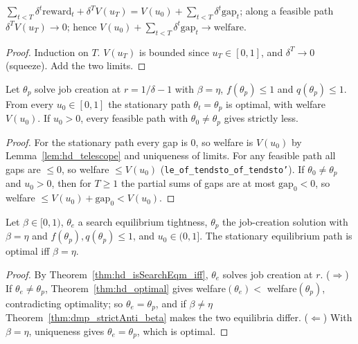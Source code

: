 \begin{lemma}
\label{lem:hd_telescope}
\leanok
{}
$\sum_{t<T}\delta^t \mathrm{reward}_t + \delta^T V(u_T) = V(u_0) + \sum_{t<T}\delta^t\mathrm{gap}_t$; along a feasible path
$\delta^T V(u_T) \to 0$; hence $V(u_0) + \sum_{t<T}\delta^t \mathrm{gap}_t \to \mathrm{welfare}$.
\end{lemma}
\begin{proof}
\leanok
Induction on $T$. $V(u_T)$ is bounded since $u_T \in [0,1]$, and $\delta^T \to 0$ (squeeze). Add the two limits.
\end{proof}

\begin{theorem}
\label{thm:hd_optimal}
\leanok
{}
Let $\theta_p$ solve job creation at $r = 1/\delta - 1$ with $\beta = \eta$, $f(\theta_p) \le 1$ and
$q(\theta_p) \le 1$. From every
$u_0 \in [0,1]$ the stationary path $\theta_t = \theta_p$ is optimal, with welfare $V(u_0)$. If $u_0 > 0$, every
feasible path with $\theta_0 \ne \theta_p$ gives strictly less.
\end{theorem}
\begin{proof}
\leanok
For the stationary path every gap is $0$, so welfare is $V(u_0)$ by Lemma~\ref{lem:hd_telescope} and uniqueness of
limits. For any feasible path all gaps are $\le 0$, so welfare $\le V(u_0)$ (\texttt{le\_of\_tendsto\_of\_tendsto'}).
If $\theta_0 \ne \theta_p$ and $u_0 > 0$, then for $T \ge 1$ the partial sums of gaps are at most
$\mathrm{gap}_0 < 0$, so welfare $\le V(u_0) + \mathrm{gap}_0 < V(u_0)$.
\end{proof}

\begin{theorem}
\label{thm:hd_hosios}
\leanok
{}
Let $\beta \in [0,1)$, $\theta_e$ a search equilibrium tightness, $\theta_p$ the job-creation solution with
$\beta = \eta$ and $f(\theta_p), q(\theta_p) \le 1$, and $u_0 \in (0, 1]$. The stationary equilibrium path is optimal iff
$\beta = \eta$.
\end{theorem}
\begin{proof}
\leanok
By Theorem~\ref{thm:hd_isSearchEqm_iff}, $\theta_e$ solves job creation at $r$. ($\Rightarrow$) If $\theta_e \ne \theta_p$,
Theorem~\ref{thm:hd_optimal} gives welfare$(\theta_e) <$ welfare$(\theta_p)$, contradicting optimality; so
$\theta_e = \theta_p$, and if $\beta \ne \eta$ Theorem~\ref{thm:dmp_strictAnti_beta} makes the two equilibria differ.
($\Leftarrow$) With $\beta = \eta$, uniqueness gives $\theta_e = \theta_p$, which is optimal.
\end{proof}

